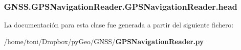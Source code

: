 \subsubsection[{head}]{\setlength{\rightskip}{0pt plus 5cm}G\-N\-S\-S.\-G\-P\-S\-Navigation\-Reader.\-G\-P\-S\-Navigation\-Reader.\-head}\label{classGNSS_1_1GPSNavigationReader_1_1GPSNavigationReader_afa1dbe2ed36951d8ce741a1c6a9338bb}


La documentación para esta clase fue generada a partir del siguiente fichero\-:\begin{DoxyCompactItemize}
\item 
/home/toni/\-Dropbox/py\-Geo/\-G\-N\-S\-S/{\bf G\-P\-S\-Navigation\-Reader.\-py}\end{DoxyCompactItemize}
